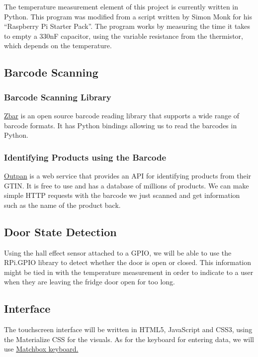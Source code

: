 \documentclass[10pt]{article}
\begin{document}
The temperature measurement element of this project is currently written in Python. This program was modified from a script written by Simon Monk for his ``Raspberry Pi Starter Pack''. The program works by measuring the time it takes to empty a 330nF capacitor, using the variable resistance from the thermistor, which depends on the temperature. 

\subsection{Barcode Scanning}
\subsubsection{Barcode Scanning Library}

\href{http://zbar.sourceforge.net/}{Zbar} is an open source barcode reading library that supports a wide range of barcode formats. It has Python bindings allowing us to read the barcodes in Python.

\subsubsection{Identifying Products using the Barcode}


\href{https://www.outpan.com/}{Outpan} is a web service that provides an API for identifying products from their GTIN. It is free to use and has a database of millions of products. We can make simple HTTP requests with the barcode we just scanned and get information such as the name of the product back.

\subsection{Door State Detection}

Using the hall effect sensor attached to a GPIO, we will be able to use the RPi.GPIO library to detect whether the door is open or closed. This information might be tied in with the temperature measurement in order to indicate to a user when they are leaving the fridge door open for too long.

\subsection{Interface}

The touchscreen interface will be written in HTML5, JavaScript and CSS3, using the Materialize CSS for the visuals. As for the keyboard for entering data, we will use \href{https://github.com/xlab/matchbox-keyboard}{Matchbox keyboard.}
\end{document}
